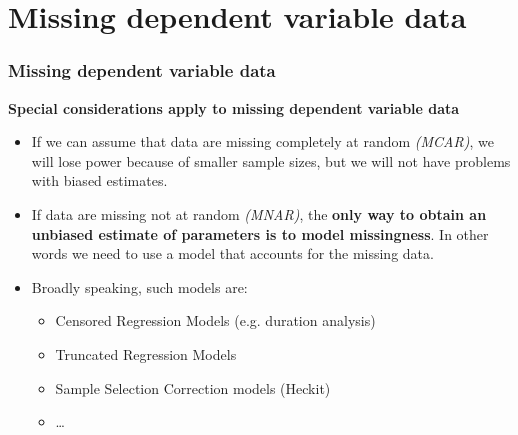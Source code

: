 \documentclass{beamer}
\begin{document}
\section{Missing dependent variable data}
\begin{frame}
\frametitle{Missing dependent variable data}

\textbf{Special considerations apply to missing dependent variable data}

\begin{itemize}
  \item If we can assume that data are missing completely at random \textit{(MCAR)}, we will lose power because of smaller sample sizes, but we will not have problems with biased estimates.
  \item If data are missing not at random \textit{(MNAR)}, the \textbf{only way to obtain an unbiased estimate of parameters is to model missingness}. In other words we need to use a model that accounts for the missing data.
  \item Broadly speaking, such models are:
  \begin{itemize}
    \item Censored Regression Models (e.g. duration analysis) 
    \item Truncated Regression Models 
    \item Sample Selection Correction models (Heckit)
    \item \dots
  \end{itemize}
\end{itemize}

\end{frame}
\end{document}
